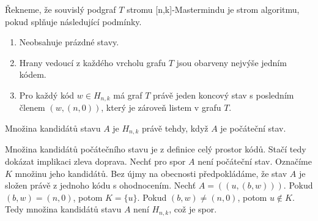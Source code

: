 \begin{definice}
  Řekneme, že souvislý podgraf $T$ stromu [n,k]-Mastermindu je strom algoritmu, pokud splňuje následující podmínky.
  \begin{enumerate}
      \item Neobsahuje prázdné stavy.
      \item Hrany vedoucí z každého vrcholu grafu $T$ jsou obarveny nejvýše jedním kódem. 
      \item Pro každý kód $w \in H_{n,k}$ má graf $T$ právě jeden koncový stav s posledním členem $(w, (n,0))$, který je zároveň listem v grafu $T$.
  \end{enumerate}
\end{definice}


\begin{lemma}\label{lemmakandidatipocstavu}
    Množina kandidátů stavu $A$ je $H_{n,k}$ právě tehdy, když $A$ je počáteční stav.
\end{lemma}
\begin{dukaz}
    Množina kandidátů počátečního stavu je z definice celý prostor kódů. Stačí tedy dokázat implikaci zleva doprava. Nechť pro spor $A$ není počáteční stav. Označíme $K$ množinu jeho kandidátů. Bez újmy na obecnosti předpokládáme, že stav $A$ je složen právě z jednoho kódu s ohodnocením. Nechť $A = ((u, (b,w)))$. Pokud $(b,w) = (n,0)$, potom $K = \{u\}$. Pokud $(b,w) \neq (n,0)$, potom $u \notin K$. Tedy množina kandidátů stavu $A$ není $H_{n,k}$, což je spor. 
\end{dukaz}

